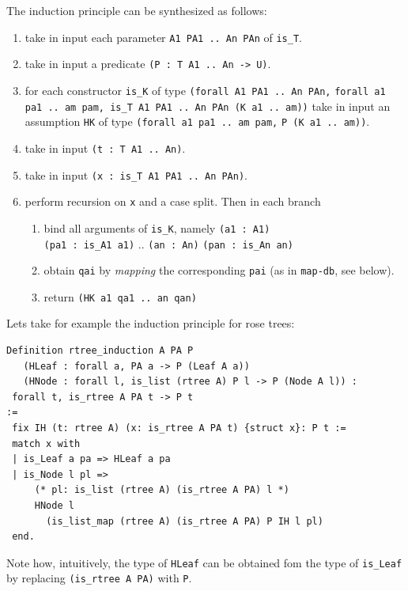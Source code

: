 \documentclass[sigplan,10pt,review]{acmart}\settopmatter{printfolios=true,printccs=false,printacmref=false}
\begin{document}
The induction principle can be synthesized as follows:
\begin{enumerate}
\item take in input each parameter
  \lstinline+A1 PA1 .. An PAn+ of \lstinline+is_T+.
\item take in input a predicate \lstinline+(P : T A1 .. An -> U)+.
\item for each constructor \lstinline+is_K+ of
	type \lstinline+(forall A1 PA1 .. An PAn,+
   \lstinline+forall a1 pa1 .. am pam, is_T A1 PA1 .. An PAn (K a1 .. am))+ 
  take in input an assumption \lstinline+HK+ of type
		\lstinline+(forall a1 pa1 .. am pam,+
		\lstinline+P (K a1 .. am))+.
\item take in input \lstinline+(t : T A1 .. An)+.
\item take in input \lstinline+(x : is_T A1 PA1 .. An PAn)+.
\item perform recursion on \lstinline+x+ and a case split. Then
	in each branch
\begin{enumerate}
\item bind all arguments of \lstinline+is_K+, namely
  \lstinline+(a1 : A1)+ \\\lstinline+(pa1 : is_A1 a1)+ ..
		\lstinline+(an : An)+ \lstinline+(pan : is_An an)+
\item obtain
  \lstinline+qai+ by \emph{mapping} the corresponding
  \lstinline+pai+ (as in \lstinline+map-db+, see below).
\item return \lstinline+(HK a1 qa1 .. an qan)+
\end{enumerate}
\end{enumerate}

Lets take for example the induction principle for rose trees:

\begin{minipage}{\textwidth}\begin{lstlisting}
Definition rtree_induction A PA P  
   (HLeaf : forall a, PA a -> P (Leaf A a))
   (HNode : forall l, is_list (rtree A) P l -> P (Node A l)) :
 forall t, is_rtree A PA t -> P t
:=
 fix IH (t: rtree A) (x: is_rtree A PA t) {struct x}: P t :=
 match x with
 | is_Leaf a pa => HLeaf a pa
 | is_Node l pl =>
     (* pl: is_list (rtree A) (is_rtree A PA) l *)
     HNode l
       (is_list_map (rtree A) (is_rtree A PA) P IH l pl)
 end.
\end{lstlisting}\end{minipage}

Note how, intuitively, the type of \lstinline+HLeaf+ can be obtained fom the
type of \lstinline+is_Leaf+ by replacing \lstinline+(is_rtree A PA)+
with \lstinline+P+.
\end{document}
